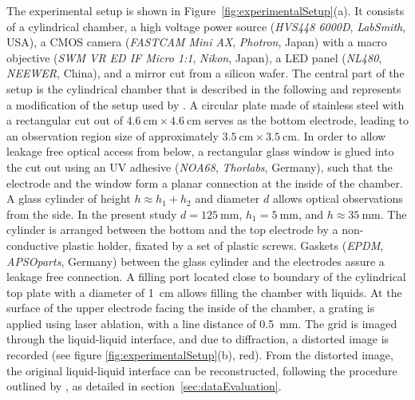 \documentclass{jfm_arxiv}
\begin{document}
The experimental setup is shown in Figure~\ref{fig:experimentalSetup}(a).
It consists of a cylindrical chamber, a high voltage power source (\textit{HVS448 6000D}, \textit{LabSmith}, USA), a CMOS camera (\textit{FASTCAM Mini AX}, \textit{Photron}, Japan) with a macro objective (\textit{SWM VR ED IF Micro 1:1}, \textit{Nikon}, Japan), a LED panel (\textit{NL480}, \textit{NEEWER}, China), and a mirror cut from a silicon wafer.
The central part of the setup is the cylindrical chamber that is described in the following and represents a modification of the setup used by \citet{Ward2019}.
A circular plate made of stainless steel with a rectangular cut out of $\SI{4.6}{\centi \meter} \times \SI{4.6}{\centi \meter}$ serves as the bottom electrode, leading to an observation region size of approximately $\SI{3.5}{\centi \meter} \times \SI{3.5}{\centi \meter}$.
In order to allow leakage free optical access from below, a rectangular glass window is glued into the cut out using an UV adhesive (\textit{NOA68}, \textit{Thorlabs}, Germany), such that the electrode and the window form a planar connection at the inside of the chamber.
A glass cylinder of height $h \approx h_1 + h_2$ and diameter $d$ allows optical observations from the side.
In the present study $d= \SI{125}{\milli \meter}$, $h_1 = \SI{5}{\milli \meter}$, and $h \approx \SI{35}{\milli \meter}$.
The cylinder is arranged between the bottom and the top electrode by a non-conductive plastic holder, fixated by a set of plastic screws.
Gaskets (\textit{EPDM}, \textit{APSOparts}, Germany) between the glass cylinder and the electrodes assure a leakage free connection.
A filling port located close to boundary of the cylindrical top plate with a diameter of \SI{1}{\centi \meter} allows filling the chamber with liquids.
At the surface of the upper electrode facing the inside of the chamber, a grating is applied using laser ablation, with a line distance of \SI{0.5}{\milli \meter}.
The grid is imaged through the liquid-liquid interface, and due to diffraction, a distorted image is recorded (see figure \ref{fig:experimentalSetup}(b), red). From the distorted image, the original liquid-liquid interface can be reconstructed, following the procedure outlined by \citet{Moisy2009}, as detailed in section~\ref{sec:dataEvaluation}.
\end{document}
